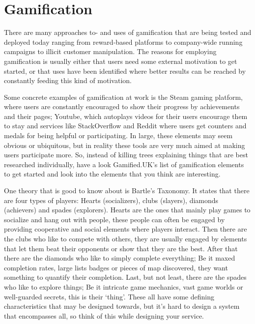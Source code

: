 \section*{Gamification}
\begin{refsection}
There are many approaches to- and uses of gamification that are being tested and deployed today ranging from reward-based platforms to company-wide running campaigns to illicit customer manipulation. The reasons for employing gamification is usually either that users need some external motivation to get started, or that uses have been identified where better results can be reached by constantly feeding this kind of motivation.

    Some concrete examples of gamification at work is the Steam gaming platform, where users are constantly encouraged to show their progress by achievements and their pages; Youtube, which autoplays videos for their users encourage them to stay and services like StackOverflow and Reddit where users get counters and medals for being helpful or participating. In large, these elements may seem obvious or ubiquitous, but in reality these tools are very much aimed at making users participate more. So, instead of killing trees explaining things that are best researched individually, have a look Gamified.UK's list of gamification\supercite{gamifieduk} elements to get started and look into the elements that you think are interesting.

    One theory that is good to know about is Bartle's Taxonomy\supercite{bartle}. It states that there are four types of players: Hearts (socializers), clubs (slayers), diamonds (achievers) and spades (explorers). Hearts are the ones that mainly play games to socialize and hang out with people, these people can often be engaged by providing cooperative and social elements where players interact. Then there are the clubs who like to compete with others, they are usually engaged by elements that let them beat their opponents or show that they are the best. After that there are the diamonds who like to simply complete everything; Be it maxed completion rates, large lists badges or pieces of map discovered, they want something to quantify their completion. Last, but not least, there are the spades who like to explore things; Be it intricate game mechanics, vast game worlds or well-guarded secrets, this is their `thing'. These all have some defining characteristics that may be designed towards, but it's hard to design a system that encompasses all, so think of this while designing your service.

\printbibliography[heading=subbibliography]

\end{refsection}

